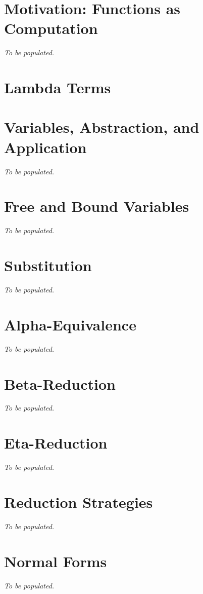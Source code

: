 \section{Motivation: Functions as Computation}
\textit{To be populated.}

\section{Lambda Terms}


\section{Variables, Abstraction, and Application}
\textit{To be populated.}

\section{Free and Bound Variables}
\textit{To be populated.}

\section{Substitution}
\textit{To be populated.}

\section{Alpha-Equivalence}
\textit{To be populated.}

\section{Beta-Reduction}
\textit{To be populated.}

\section{Eta-Reduction}
\textit{To be populated.}

\section{Reduction Strategies}
\textit{To be populated.}

\section{Normal Forms}
\textit{To be populated.}

